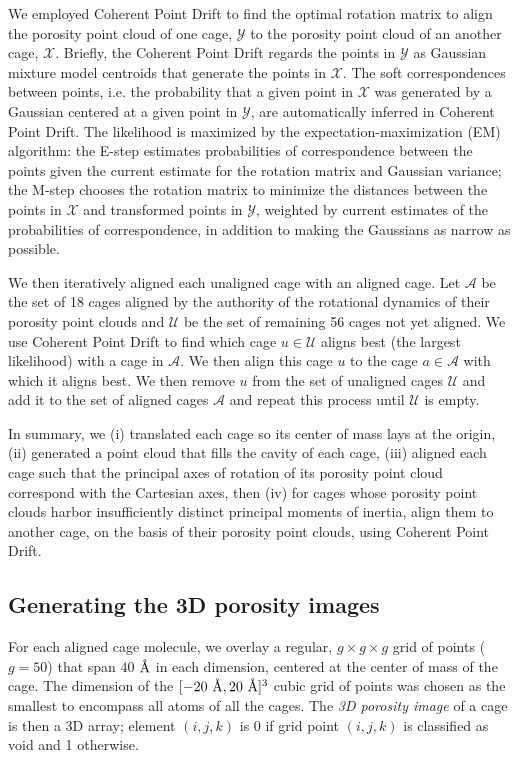 \documentclass[journal=jacsat,manuscript=article,layout=traditional]{achemso}
\newcommand{\angstrom}{\mbox{\normalfont\AA}}
\begin{document}
{We employed Coherent Point Drift\cite{myronenko2010point} to find the optimal rotation matrix to align the porosity point cloud of one cage, $\mathcal{Y}$ to the porosity point cloud of an another cage, $\mathcal{X}$. Briefly, the Coherent Point Drift regards the points in $\mathcal{Y}$ as Gaussian mixture model centroids that generate the points in $\mathcal{X}$. The soft correspondences between points, i.e. the probability that a given point in $\mathcal{X}$ was generated by a Gaussian centered at a given point in $\mathcal{Y}$, are automatically inferred in Coherent Point Drift. The likelihood is maximized by the expectation-maximization (EM) algorithm: the E-step estimates probabilities of correspondence between the points given the current estimate for the rotation matrix and Gaussian variance; the M-step chooses the rotation matrix to minimize the distances between the points in $\mathcal{X}$ and transformed points in $\mathcal{Y}$, weighted by current estimates of the probabilities of correspondence, in addition to making the Gaussians as narrow as possible.

We then iteratively aligned each unaligned cage with an aligned cage. Let $\mathcal{A}$ be the set of 18 cages aligned by the authority of the rotational dynamics of their porosity point clouds and $\mathcal{U}$ be the set of remaining 56 cages not yet aligned. We use Coherent Point Drift to find which cage $u \in \mathcal{U}$ aligns best (the largest likelihood) with a cage in $\mathcal{A}$. We then align this cage $u$ to the cage $a \in \mathcal{A}$ with which it aligns best. We then remove $u$ from the set of unaligned cages $\mathcal{U}$ and add it to the set of aligned cages $\mathcal{A}$ and repeat this process until $\mathcal{U}$ is empty.

In summary, we (i) translated each cage so its center of mass lays at the origin, (ii) generated a point cloud that fills the cavity of each cage, (iii) aligned each cage such that the principal axes of rotation of its porosity point cloud correspond with the Cartesian axes, then (iv) for cages whose porosity point clouds harbor insufficiently distinct principal moments of inertia, align them to another cage, on the basis of their porosity point clouds, using Coherent Point Drift\cite{myronenko2010point}.
}

\subsection{Generating the 3D porosity images}
For each aligned cage molecule, we overlay a regular, $g\times g\times g$ grid of points ($g=50$) that span $40$ $\angstrom$ in each dimension, centered at the center of mass of the cage. The dimension of the $[-20 \text{ } \angstrom, 20 \text{ } \angstrom]^3$ cubic grid of points was chosen as the smallest to encompass all atoms of all the cages. The \emph{3D porosity image} of a cage is then a 3D array; element $(i, j, k)$ is 0 if grid point $(i, j, k)$ is classified as void and 1 otherwise. 
\end{document}
